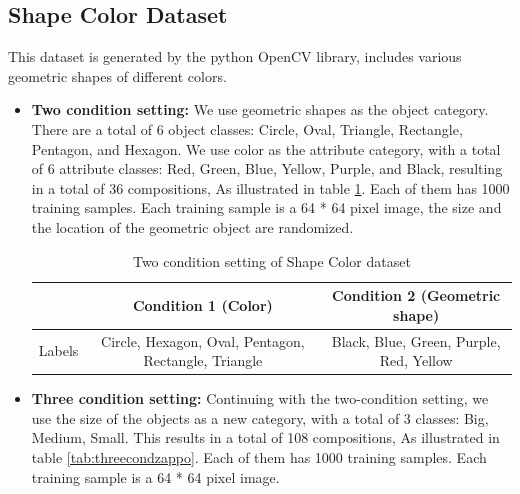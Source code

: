 \subsection{Shape Color Dataset}
\label{subsec:shapecolor}
This dataset is generated by the python OpenCV library, includes various geometric shapes of different colors.
\begin{itemize}
    \item \textbf{Two condition setting:} We use geometric shapes as the object category. There are a total of 6 object classes: Circle, Oval, Triangle, Rectangle, Pentagon, and Hexagon. We use color as the attribute category, with a total of 6 attribute classes: Red, Green, Blue, Yellow, Purple, and Black, resulting in a total of 36 compositions, As illustrated in table \ref{tab:twocondshape}. Each of them has 1000 training samples. Each training sample is a 64 * 64 pixel image, the size and the location of the geometric object are randomized.
    
    \begin{table} [H]
        \centering
        \begin{tabular}{c|c|c}
             & Condition 1 (Color) & Condition 2 (Geometric shape)\\
             \hline
             Labels & Circle, Hexagon, Oval, Pentagon, Rectangle, Triangle & Black, Blue, Green, Purple, Red, Yellow \\
        \end{tabular}
        \caption{Two condition setting of Shape Color dataset}
        \label{tab:twocondshape}
    \end{table}
    
    \item \textbf{Three condition setting:} Continuing with the two-condition setting, we use the size of the objects as a new category, with a total of 3 classes: Big, Medium, Small. This results in a total of 108 compositions, As illustrated in table \ref{tab:threecondzappo}. Each of them has 1000 training samples. Each training sample is a 64 * 64 pixel image.

    \begin{table} [H]
        \caption{Three condition setting of Shape Color dataset}
        \label{tab:threecondshape}
    \end{table}
\end{itemize}

